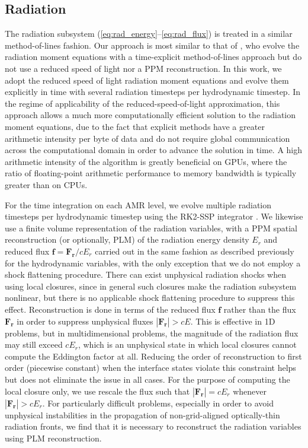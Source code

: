 \documentclass[fleqn,usenatbib]{mnras}
\begin{document}
\subsection{Radiation}
The radiation subsystem (\autoref{eq:rad_energy}--\autoref{eq:rad_flux}) is treated in a similar method-of-lines fashion. Our approach is most similar to that of \cite{Skinner_2019}, who evolve the radiation moment equations with a time-explicit method-of-lines approach but do not use a reduced speed of light nor a PPM reconstruction. In this work, we adopt the reduced speed of light radiation moment equations \citep{Skinner_2013} and evolve them explicitly in time with several radiation timesteps per hydrodynamic timestep. In the regime of applicability of the reduced-speed-of-light approximation, this approach allows a much more computationally efficient solution to the radiation moment equations, due to the fact that explicit methods have a greater arithmetic intensity per byte of data and do not require global communication across the computational domain in order to advance the solution in time. A high arithmetic intensity of the algorithm is greatly beneficial on GPUs, where the ratio of floating-point arithmetic performance to memory bandwidth is typically greater than on CPUs.

For the time integration on each AMR level, we evolve multiple radiation timesteps per hydrodynamic timestep using the RK2-SSP integrator \citep{Shu_1988}. We likewise use a finite volume representation of the radiation variables, with a PPM spatial reconstruction (or optionally, PLM) of the radiation energy density $E_r$ and reduced flux $\mathbf{f} = \mathbf{F_r} / cE_r$ carried out in the same fashion as described previously for the hydrodynamic variables, with the only exception that we do not employ a shock flattening procedure. There can exist unphysical radiation shocks when using local closures, since in general such closures make the radiation subsystem nonlinear, but there is no applicable shock flattening procedure to suppress this effect. Reconstruction is done in terms of the reduced flux $\mathbf{f}$ rather than the flux $\mathbf{F_r}$ in order to suppress unphysical fluxes $|\mathbf{F_r}| > cE$. This is effective in 1D problems, but in multidimensional problems, the magnitude of the radiation flux may still exceed $cE_r$, which is an unphysical state in which local closures cannot compute the Eddington factor at all. Reducing the order of reconstruction to first order (piecewise constant) when the interface states violate this constraint helps but does not eliminate the issue in all cases. For the purpose of computing the local closure only, we use rescale the flux such that $|\mathbf{F_r}| = cE_r$ whenever $|\mathbf{F_r}| > cE_r$.  For particularly difficult problems, especially in order to avoid unphysical instabilities in the propagation of non-grid-aligned optically-thin radiation fronts, we find that it is necessary to reconstruct the radiation variables using PLM reconstruction.
\end{document}
